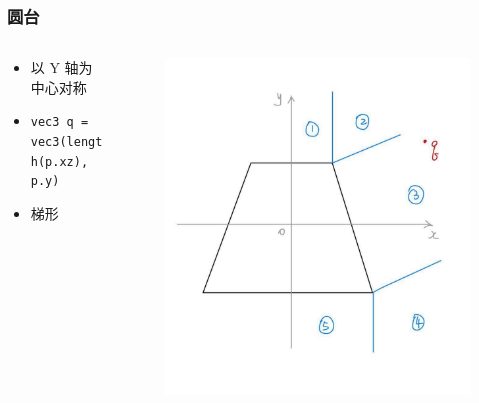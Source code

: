 \documentclass[aspectratio=169]{ctexbeamer} %
\begin{document}
\begin{frame}
    \frametitle{圆台} %
    \begin{columns}
        \begin{column}{.6\textwidth}
            \begin{itemize}
                \item 以 Y 轴为中心对称
                \item \texttt{vec3 q = vec3(length(p.xz), p.y)}
                \item 梯形
            \end{itemize}
        \end{column}
        \begin{column}{.4\textwidth}
            \begin{figure}[htbp]
                \centering
                \includegraphics[height=.65\textheight]{images/pre/cone_derive.pdf}
                \caption{}
                \label{fig:cone_derive}
            \end{figure}
        \end{column}
    \end{columns}
\end{frame}
\end{document}

